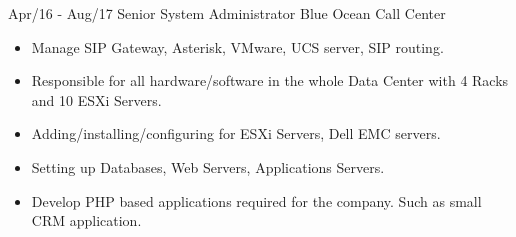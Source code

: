 \documentclass[]{friggeri-cv}
\begin{document}
\begin{entrylist}
{    }
  \entry
    {Apr/16 - Aug/17}
    {Senior System Administrator}
    {Blue Ocean Call Center}
    {
      \begin{itemize}
        \item Manage SIP Gateway, Asterisk, VMware, UCS server, SIP routing.
        \item Responsible for all hardware/software in the whole Data Center with 4 Racks and 10 ESXi Servers.
        \item Adding/installing/configuring for ESXi Servers, Dell EMC servers.
        \item Setting up Databases, Web Servers, Applications Servers.
        \item Develop PHP based applications required for the company. Such as small CRM application.
      \end{itemize}
      }
\end{entrylist}
\end{document}
